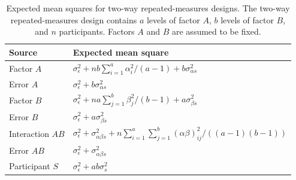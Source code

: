 \documentclass[preprint,12pt,authoryear]{elsarticle}
\begin{document}
\begin{table}[t]
	\centering
	\begin{tabular}{@{}ll@{}}
		\toprule
		Source           & Expected mean square                                                                                    \\ \midrule
		Factor $A$       & $\sigma_\epsilon^2+nb\sum_{i=1}^a\alpha_i^2/(a-1)+b\sigma_{\alpha s}^2$                                 \\
		Error $A$        & $\sigma_\epsilon^2+b\sigma_{\alpha s}^2$                                                                \\
		Factor $B$       & $\sigma_\epsilon^2+na\sum_{j=1}^b\beta_j^2/(b-1)+a\sigma_{\beta s}^2$                                   \\
		Error $B$        & $\sigma_\epsilon^2+a\sigma_{\beta s}^2$                                                                 \\
		Interaction $AB$ & $\sigma_\epsilon^2+\sigma_{\alpha\beta s}^2+n\sum_{i=1}^a\sum_{j=1}^b(\alpha\beta)_{ij}^2/((a-1)(b-1))$ \\
		Error $AB$       & $\sigma_\epsilon^2+\sigma_{\alpha\beta s}^2$                                                            \\
		Participant $S$  & $\sigma_\epsilon^2+ab\sigma_s^2$                                                                        \\ \bottomrule
	\end{tabular}
\caption{Expected mean squares for two-way repeated-measures designs. The two-way repeated-measures design contains $a$ levels of factor $A$, $b$ levels of factor $B$, and $n$ participants. Factors $A$ and $B$ are assumed to be fixed.}\label{tbl1}
\end{table}
\end{document}
